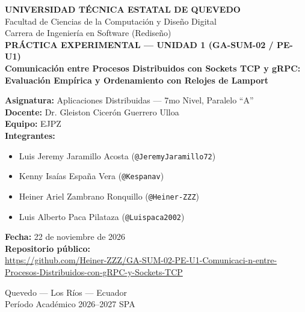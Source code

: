 \documentclass[12pt,a4paper]{article}
\begin{document}
\begin{titlepage}
  \centering
  \vspace*{0.8cm}
  {\Large \textbf{UNIVERSIDAD TÉCNICA ESTATAL DE QUEVEDO}}\\[0.25cm]
  {\large Facultad de Ciencias de la Computación y Diseño Digital}\\[0.15cm]
  {\large Carrera de Ingeniería en Software (Rediseño)}\\[1.5cm]

  {\large \textbf{PRÁCTICA EXPERIMENTAL — UNIDAD 1 (GA-SUM-02 / PE-U1)}}\\[0.5cm]
  {\LARGE \textbf{Comunicación entre Procesos Distribuidos con Sockets TCP y gRPC: Evaluación Empírica y Ordenamiento con Relojes de Lamport}}\\[1.5cm]

  \begin{flushleft}
    \textbf{Asignatura:} Aplicaciones Distribuidas — 7mo Nivel, Paralelo ``A''\\[0.25cm]
    \textbf{Docente:} Dr. Gleiston Cicerón Guerrero Ulloa\\[0.25cm]
    \textbf{Equipo:} EJPZ\\[0.25cm]
    \textbf{Integrantes:}
    \begin{itemize}
      \item Luis Jeremy Jaramillo Acosta (\texttt{@JeremyJaramillo72})
      \item Kenny Isaías España Vera (\texttt{@Kespanav})
      \item Heiner Ariel Zambrano Ronquillo (\texttt{@Heiner-ZZZ})
      \item Luis Alberto Paca Pilataza (\texttt{@Luispaca2002})
    \end{itemize}
    \textbf{Fecha:} 22 de noviembre de 2026\\[0.25cm]
    \textbf{Repositorio público:}\\
    {\footnotesize \url{https://github.com/Heiner-ZZZ/GA-SUM-02-PE-U1-Comunicaci-n-entre-Procesos-Distribuidos-con-gRPC-y-Sockets-TCP}}
  \end{flushleft}

  \vfill
  Quevedo — Los Ríos — Ecuador\\
  Período Académico 2026--2027 SPA
\end{titlepage}

\tableofcontents
\newpage



% 
% 
% 
% 
% 
% 
% 
% 
% 

\newpage
\printbibliography[title={Referencias}]
\end{document}
